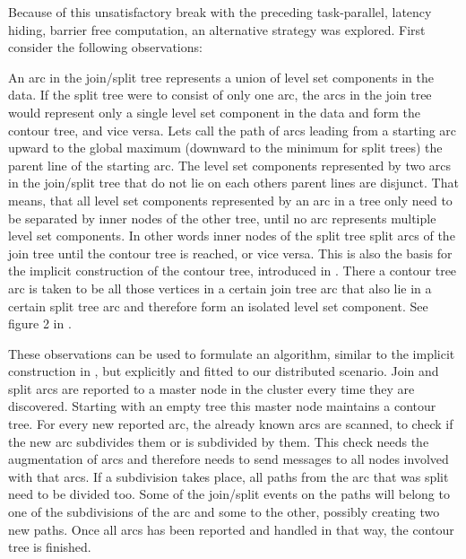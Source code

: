 \documentclass{scrartcl}
\begin{document}
Because of this unsatisfactory break with the preceding task-parallel,  latency hiding, barrier free computation, an alternative strategy was explored. First consider the following observations:

An arc in the join/split tree represents a union of level set components in the data. If the split tree were to consist of only one arc, the arcs in the join tree would represent only a single level set component in the data and form the contour tree, and vice versa. Lets call the path of arcs leading from a starting arc upward to the global maximum (downward to the minimum for split trees) the parent line of the starting arc. The level set components represented by two arcs in the join/split tree that do not lie on each others parent lines are disjunct. That means, that all level set components represented by an arc in a tree only need to be separated by inner nodes of the other tree, until no arc represents multiple level set components. In other words inner nodes of the split tree split arcs of the join tree until the contour tree is reached, or vice versa. This is also the basis for the implicit construction of the contour tree, introduced in \cite{chiang}. There a contour tree arc is taken to be all those vertices in a certain join tree arc that also lie in a certain split tree arc and therefore form an isolated level set component. See figure 2 in \cite{chiang}.

These observations can be used to formulate an algorithm, similar to the implicit construction in \cite{chiang}, but explicitly and fitted to our distributed scenario.  Join and split arcs are reported to a master node in the cluster every time they are discovered. Starting with an empty tree this master node maintains a contour tree. For every new reported arc, the already known arcs are scanned, to check if the new arc subdivides them or is subdivided by them. This check needs the augmentation of arcs and therefore needs to send messages to all nodes involved with that arcs. If a subdivision takes place, all paths from the arc that was split need to be divided too. Some of the join/split events on the paths will belong to one of the subdivisions of the arc and some to the other, possibly creating two new paths. Once all arcs has been reported and handled in that way, the contour tree is finished. 
\end{document}
